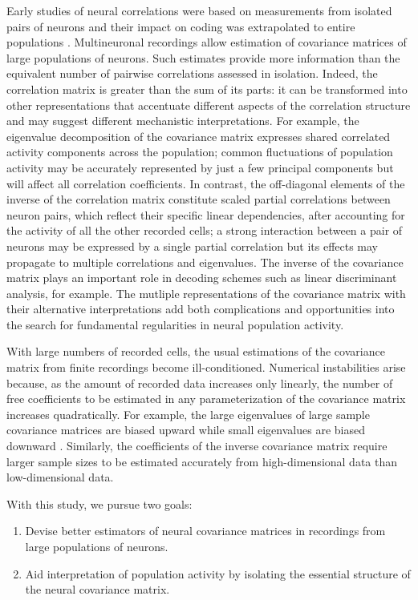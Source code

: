 Early studies of neural correlations were based on measurements from isolated pairs of neurons and their impact on coding was extrapolated to entire populations \citep{Shadlen:1998,Zohary:1994}.  Multineuronal recordings allow estimation of covariance matrices of large populations of neurons.  Such estimates provide more information than the equivalent number of pairwise correlations assessed in isolation. Indeed, the correlation matrix is greater than the sum of its parts: it can be transformed into other representations that accentuate different aspects of the correlation structure and may suggest different mechanistic interpretations. For example, the eigenvalue decomposition of the covariance matrix expresses shared correlated activity components across the population; common fluctuations of population activity may be accurately represented by just a few principal components but will affect all correlation coefficients. In contrast, the off-diagonal elements of the inverse of the correlation matrix constitute scaled partial correlations between neuron pairs, which reflect their specific linear dependencies, after accounting for the activity of all the other recorded cells; a strong interaction between a pair of neurons may be expressed by a single partial correlation but its effects may propagate to multiple correlations and eigenvalues.   The inverse of the covariance matrix plays an important role in decoding schemes such as linear discriminant analysis, for example.  The mutliple  representations of the covariance matrix with their alternative interpretations add both complications and opportunities into the search for fundamental regularities in neural population activity. 

With large numbers of recorded cells, the usual estimations of the covariance matrix from finite recordings become ill-conditioned. Numerical instabilities arise because, as the amount of recorded data increases only linearly, the number of free coefficients to be estimated in any parameterization of the covariance matrix increases quadratically. 
For example, the large eigenvalues of large sample covariance matrices are biased upward while small eigenvalues are biased downward \citep{Hayes:1981}. Similarly, the coefficients of the inverse covariance matrix require larger sample sizes to be estimated accurately from high-dimensional data than low-dimensional data.

With this study, we pursue two goals: 
\begin{enumerate}[\qquad A.\;\;]
	\item Devise better estimators of neural covariance matrices in recordings from large populations of neurons.
	\item Aid interpretation of population activity  by isolating the essential structure of the neural covariance matrix.
\end{enumerate}

